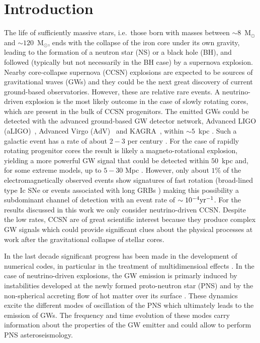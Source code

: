 
\section{Introduction}


The life of sufficiently massive stars, i.e.~those born with masses between $\sim 8$~M$_\odot$ and $\sim 120$~M$_\odot$, ends with the collapse of {the} iron core under {its} own gravity, leading {to} the formation of a neutron star {(NS)} or a black hole (BH), {and} followed (typically but not necessarily in the BH case) by {a supernova} explosion. Nearby core-collapse supernova (CCSN) explosions are expected to be sources of gravitational waves (GWs) and they could be 
the next great discovery of current ground-based observatories. However, these are relative rare events. A neutrino-driven explosion \citep{Bethe:1990} is the most likely outcome in the case of slowly rotating cores, which are present in the bulk of CCSN progenitors. The emitted GWs could be detected with the advanced ground-based GW detector network, Advanced LIGO (aLIGO)~\citep{TheLIGOScientific:2014jea}, Advanced Virgo (AdV)~\citep{TheVirgo:2014hva} and
KAGRA~\citep{Aso:2013eba}, within $\sim 5$~kpc \citep{Gossan:2016,TargetedSNSearchO12}. Such a galactic event has a rate of about $2-3$ per century \citep{Adams:2013,Rozwadowska:2021}.
For the case of rapidly rotating progenitor cores the result is likely a magneto-rotational explosion, yielding  a more powerful GW signal that could be detected within $50$~kpc and, for some extreme models, up to $5-30$ Mpc \citep{Gossan:2016,TargetedSNSearchO12}. However, only about $1\%$ of the electromagnetically observed events show signatures of fast rotation (broad-lined type Ic SNe \citep{Li:2011b} or events associated with long GRBs 
\citep{Chapman:2007}) making this possibility a subdominant channel of detection with an event rate of $\sim 10^{-4} \rm{yr}^{-1}$. For the results discussed in this work we only consider neutrino-driven CCSN.  Despite the low rates, CCSN are of great scientific interest because they produce complex GW signals which could provide significant clues about the physical processes at work after the gravitational collapse of stellar cores. 

In the last decade significant progress has been made in the development of numerical codes, {in particular in the treatment of multidimensioal effects \citep{BMueller:2020}.} In the case of  neutrino-driven explosions, the GW emission is {primarly induced by instabilities developed at the newly formed proto-neutron star (PNS) and by the non-spherical accreting flow of hot matter over its surface \citep{Kotake:2017}.  These} dynamics excite the different modes of oscillation of the PNS which ultimately leads to the emission of GWs. The frequency and time evolution of these modes carry information about the properties of the GW emitter and could allow to perform PNS asteroseismology. 


